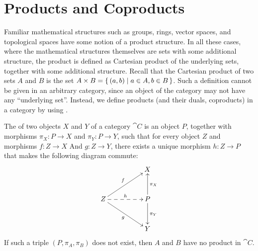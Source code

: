 \section{Products and Coproducts}\label{sec:ProductsCoproducts}

Familiar mathematical structures such as groups, rings, vector spaces, and topological spaces have some notion of a product structure. In all these cases, where the mathematical structures themselves are sets with some additional structure, the product is defined as Cartesian product of the underlying sets, together with some additional structure. Recall that the Cartesian product of two sets $A$ and $B$ is the set $A \times B = \qty{\, (a, b) \mid a \in A, b \in B \,}$. Such a definition cannot be given in an arbitrary category, since an object of the category may not have any ``underlying set''. Instead, we define products (and their duals, coproducts) in a category by using .

The  of two objects $X$ and $Y$ of a category $\cat C$ is an object $P$, together with morphisms $\pi_X \colon P \to X$ and $\pi_Y \colon P \to Y$, such that for every object $Z$ and morphisms $f \colon Z \to X$ And $g \colon Z \to Y$, there exists a unique morphism $h \colon Z \to P$ that makes the following diagram commute:
\begin{equation*}
\xymatrix@=3em@C=5em{
& X \\
Z \ar[ru]^f \ar[rd]_g \ar@{-->}[r]^h & P \ar[u]_{\pi_X} \ar[d]^{\pi_Y}\\
& Y
}
\end{equation*}
If such a triple $(P, \pi_A, \pi_B)$ does not exist, then $A$ and $B$ have no product in $\cat C$.


